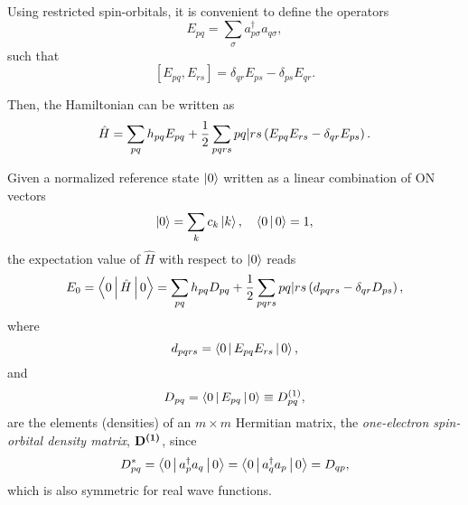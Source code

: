 Using restricted spin-orbitals, it is convenient to define the operators 
\begin{equation}
    E_{pq} =
    \sum_{\sigma} a_{p\sigma}^{\dagger} a_{q\sigma}
    ,
\end{equation}
such that 
\begin{equation}
    \left[ E_{pq}, E_{rs} \right] =
    \delta_{qr} E_{ps} - \delta_{ps} E_{qr}
    .
\end{equation}

Then, the Hamiltonian can be written as 
\begin{equation}
    \hat{H} =
    \sum_{pq} h_{pq} E_{pq}
    + \frac{1}{2}
    \sum_{pqrs} \PBraket{pq | rs}\left( E_{pq} E_{rs} - \delta_{qr}E_{ps} \right)
    .
\end{equation}

Given a normalized reference state
$\Ket{0}$ written as a linear combination of ON vectors 
\begin{equation}
    \Ket{0} = \sum_{k} c_k \Ket{k}
    , \quad
    \Braket{0 | 0} = 1
    ,
\end{equation}
the expectation value of $\hat{H}$ with respect to $\Ket{0}$ reads
\begin{equation} \label{eq:GS-energy-1}
    E_0 = \Braket{0 | \hat{H} | 0} =
    \sum_{pq} h_{pq} D_{pq} + \frac{1}{2} \sum_{pqrs}
    \PBraket{pq | rs} \left( d_{pqrs} - \delta_{qr} D_{ps} \right)
    ,
\end{equation}
where 
\begin{equation}
    d_{pqrs} = \Braket{0 | E_{pq} E_{rs} | 0}
    ,
\end{equation}
and
\begin{equation} \label{eq:oedm-spin-representation}
    D_{pq} = \Braket{0 | E_{pq} | 0} \equiv \oedm_{pq}
    ,
\end{equation}
are the elements (densities) of an $m \times m$ Hermitian matrix, the
\textit{one-electron spin-orbital density matrix}, $ \mat{\oedm}$, since 
\begin{equation}
    D_{pq}^{*} =
    \Braket{0 | a_p^{\dagger} a_q | 0} =
    \Braket{0 | a_q^{\dagger} a_p | 0} =
    D_{qp}
    ,
\end{equation}
which is also symmetric for real wave functions.

